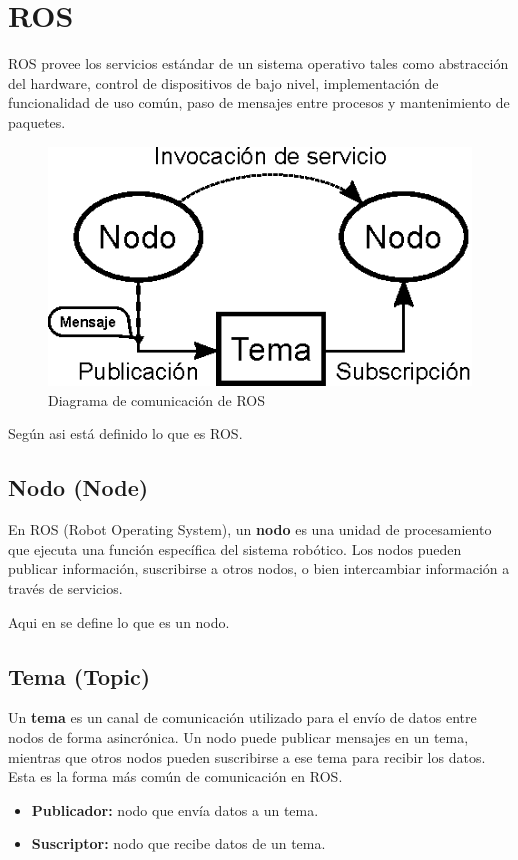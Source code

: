\section{ROS} \label{sec:ros}
ROS provee los servicios estándar de un sistema operativo tales como abstracción del hardware, control de dispositivos de bajo nivel, implementación de funcionalidad de uso común, paso de mensajes entre procesos y mantenimiento de paquetes.
\begin{figure}[h]
	\centering
	\includegraphics[width=0.5\linewidth]{img/ROS_concepts}
	\caption{Diagrama de comunicación de ROS}
	\label{fig:rosconcepts}
\end{figure}

Según \cite{ubuntuROS} asi está definido lo que es ROS.

\subsection{Nodo (Node)}

En ROS (Robot Operating System), un \textbf{nodo} es una unidad de procesamiento que ejecuta una función específica del sistema robótico. Los nodos pueden publicar información, suscribirse a otros nodos, o bien intercambiar información a través de servicios.

Aqui en \cite{rosNodeRoboticsBackend} se define lo que es un nodo.

\subsection{Tema (Topic)}

Un \textbf{tema} es un canal de comunicación utilizado para el envío de datos entre nodos de forma asincrónica. Un nodo puede publicar mensajes en un tema, mientras que otros nodos pueden suscribirse a ese tema para recibir los datos. Esta es la forma más común de comunicación en ROS.
 
 
\begin{itemize}
	\item \textbf{Publicador:} nodo que envía datos a un tema.
	\item \textbf{Suscriptor:} nodo que recibe datos de un tema.
\end{itemize}


